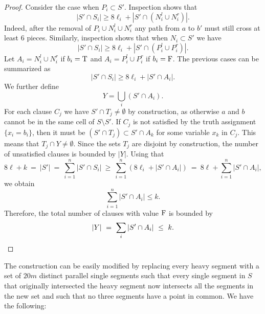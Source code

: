 \documentclass[11pt,a4paper]{article}
\def\true{{\rm T}}
\def\false{{\rm F}}
\begin{document}
\begin{proof}
Consider the case when $P_i\subset S'$. Inspection shows that 
\[
	|S'\cap S_i| \ge 8\ell_i + |S'\cap (N_i^l \cup  N_i^r)|.
\]
Indeed, after the removal of $P_i\cup N_i^l \cup  N_i^r$ any path from $a$ to $b'$ must still cross at least $6$ pieces. Similarly, inspection shows that when $N_i\subset S'$ we have 
\[
	|S'\cap S_i| \ge 8\ell_i + |S'\cap (P_i^l \cup  P_i^r)|.
\] 
Let $A_i= N_i^l \cup  N_i^r$ if $b_i=\true$ and $A_i= P_i^l \cup  P_i^r$ if $b_i=\false$. The previous cases can be summarized as 
\[
	|S'\cap S_i| \ge 8\ell_i + |S'\cap A_i|.
\]
We further define
\[
	Y= \bigcup_i (S'\cap A_i).
\]
For each clause $C_j$ we have $S'\cap T_j\not= \emptyset$ by construction, as otherwise $a$ and $b$ cannot be in the same cell of $S\setminus S'$. If $C_j$ is not satisfied by the truth assignment $\{x_i=b_i\}$, then it must be $(S'\cap T_j)\subset S'\cap A_k$ for some variable $x_k$ in $C_j$. This means that  
$T_j\cap Y\not=\emptyset$. Since the sets $T_j$ are disjoint by construction, the number of unsatisfied clauses is bounded by $|Y|$.
Using that 
\[
	8\ell + k~ = ~ |S'| ~=~ \sum_{i=1}^n |S' \cap S_i| ~\ge~ \sum_{i=1}^n (8\ell_i + |S'\cap A_i|) ~=~ 8\ell + \sum_{i=1}^n |S'\cap A_i|,
\]
we obtain 
\[
	\sum_{i=1}^n |S'\cap A_i| \le k.
\]
Therefore, the total number of clauses with value $\false$ is bounded by
\[
	|Y| ~=~ \sum_i |S'\cap A_i| ~\le~ k.\qedhere
\]
\end{proof}
The construction can be easily modified by replacing every heavy segment with a set of $20m$ distinct parallel single segments such that every single segment in $S$ that originally intersected the heavy segment now intersects all the segments in the new set and such that no three segments have a point in common. We have the following:
\end{document}
